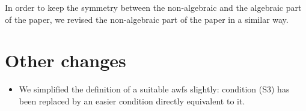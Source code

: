 \documentclass[reqno,10pt,a4paper,oneside,draft]{amsart}
\begin{document}
In order to keep the symmetry between the non-algebraic and the algebraic part of the paper,
we  revised  the non-algebraic part of the paper in a similar way. 







\section*{Other changes} 


\begin{itemize}
\item
We simplified the definition of a suitable awfs slightly: condition (S3) has been replaced by an easier condition directly equivalent to it.
\end{itemize}
\end{document}
